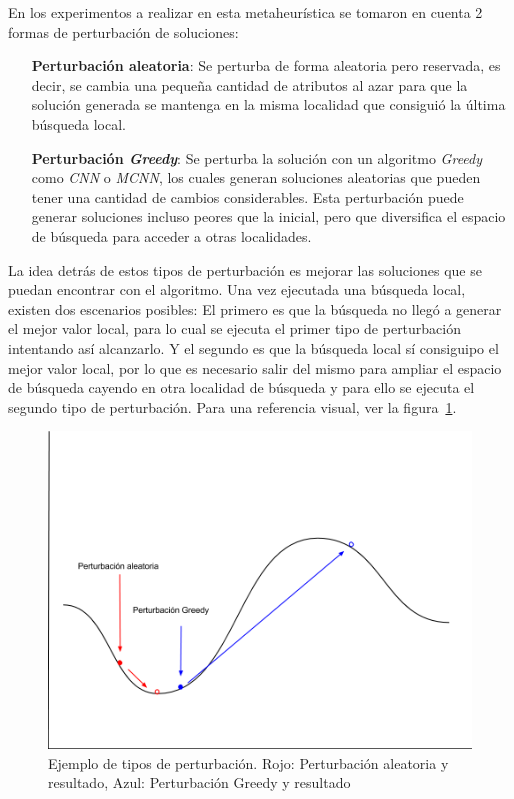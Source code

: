 \documentclass{ci5652}
\begin{document}
En los experimentos a realizar en esta metaheurística se tomaron en cuenta 2 formas de perturbación de soluciones:

\begin{itemize}
    \item [\textbf{Perturbación aleatoria}:] Se perturba de forma aleatoria pero reservada, es decir, se cambia una pequeña cantidad de atributos al azar para que la solución generada se mantenga en la misma localidad que consiguió la última búsqueda local.
    \item [\textbf{Perturbación \textit{Greedy}}:] Se perturba la solución con un algoritmo \textit{Greedy} como \textit{CNN }o \textit{MCNN}, los cuales generan soluciones aleatorias que pueden tener una cantidad de cambios considerables. Esta perturbación puede generar soluciones incluso peores que la inicial, pero que diversifica el espacio de búsqueda para acceder a otras localidades.
\end{itemize}

La idea detrás de estos tipos de perturbación es mejorar las soluciones que se puedan encontrar con el algoritmo. Una vez ejecutada una búsqueda local, existen dos escenarios posibles: El primero es que la búsqueda no llegó a generar el mejor valor local, para lo cual se ejecuta el primer tipo de perturbación intentando así alcanzarlo. Y el segundo es que la búsqueda local sí consiguipo el mejor valor local, por lo que es necesario salir del mismo para ampliar el espacio de búsqueda cayendo en otra localidad de búsqueda y para ello se ejecuta el segundo tipo de perturbación. Para una referencia visual, ver la figura~\ref{fig:perturbaciones}.

\begin{figure}[h!]
    \centering
    \includegraphics[width=\linewidth]{perturbaciones}
    \caption{Ejemplo de tipos de perturbación. Rojo: Perturbación aleatoria y resultado, Azul: Perturbación Greedy y resultado}
    \label{fig:perturbaciones}
\end{figure}
\end{document}
